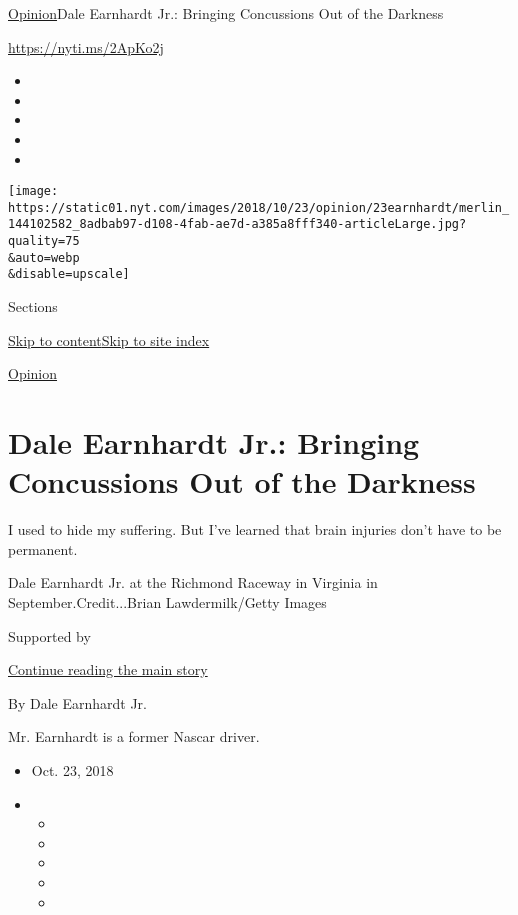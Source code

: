 \href{/section/opinion}{Opinion}\textbar{}Dale Earnhardt Jr.: Bringing
Concussions Out of the Darkness

\href{https://nyti.ms/2ApKo2j}{https://nyti.ms/2ApKo2j}

\begin{itemize}
\item
\item
\item
\item
\item
\end{itemize}

\texttt{[image: https://static01.nyt.com/images/2018/10/23/opinion/23earnhardt/merlin\_144102582\_8adbab97-d108-4fab-ae7d-a385a8fff340-articleLarge.jpg?quality=75\\\&auto=webp\\\&disable=upscale]}

Sections

\protect\hyperlink{site-content}{Skip to
content}\protect\hyperlink{site-index}{Skip to site index}

\href{/section/opinion}{Opinion}

\hypertarget{dale-earnhardt-jr-bringing-concussions-out-of-the-darkness}{%
\section{Dale Earnhardt Jr.: Bringing Concussions Out of the
Darkness}\label{dale-earnhardt-jr-bringing-concussions-out-of-the-darkness}}

I used to hide my suffering. But I've learned that brain injuries don't
have to be permanent.

Dale Earnhardt Jr. at the Richmond Raceway in Virginia in
September.Credit...Brian Lawdermilk/Getty Images

Supported by

\protect\hyperlink{after-sponsor}{Continue reading the main story}

By Dale Earnhardt Jr.

Mr. Earnhardt is a former Nascar driver.

\begin{itemize}
\item
  Oct. 23, 2018
\item
  \begin{itemize}
  \item
  \item
  \item
  \item
  \item
  \end{itemize}
\end{itemize}

